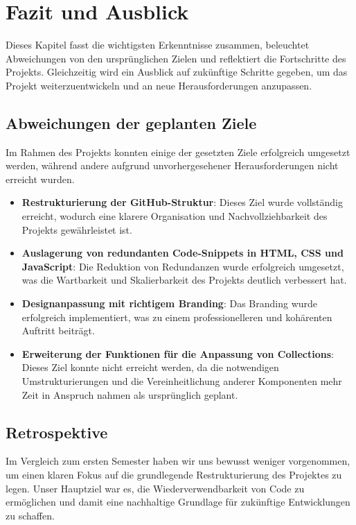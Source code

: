 \section{Fazit und Ausblick}\label{sec:fazit-ausblick}

Dieses Kapitel fasst die wichtigsten Erkenntnisse zusammen, beleuchtet Abweichungen von den ursprünglichen Zielen und reflektiert die Fortschritte des Projekts.
Gleichzeitig wird ein Ausblick auf zukünftige Schritte gegeben, um das Projekt weiterzuentwickeln und an neue Herausforderungen anzupassen.

\subsection{Abweichungen der geplanten Ziele}\label{subsec:abweichungen-der-geplanten-ziele}

Im Rahmen des Projekts konnten einige der gesetzten Ziele erfolgreich umgesetzt werden, während andere aufgrund unvorhergesehener Herausforderungen nicht erreicht wurden.

\begin{itemize}[noitemsep]
    \item \textbf{Restrukturierung der GitHub-Struktur}: Dieses Ziel wurde vollständig erreicht, wodurch eine klarere Organisation und Nachvollziehbarkeit des Projekts gewährleistet ist.
    \item \textbf{Auslagerung von redundanten Code-Snippets in HTML, CSS und JavaScript}: Die Reduktion von Redundanzen wurde erfolgreich umgesetzt, was die Wartbarkeit und Skalierbarkeit des Projekts deutlich verbessert hat.
    \item \textbf{Designanpassung mit richtigem Branding}: Das Branding wurde erfolgreich implementiert, was zu einem professionelleren und kohärenten Auftritt beiträgt.
    \item \textbf{Erweiterung der Funktionen für die Anpassung von Collections}: Dieses Ziel konnte nicht erreicht werden, da die notwendigen Umstrukturierungen und die Vereinheitlichung anderer Komponenten mehr Zeit in Anspruch nahmen als ursprünglich geplant.
\end{itemize}

\subsection{Retrospektive}\label{subsec:retrospektive}

Im Vergleich zum ersten Semester haben wir uns bewusst weniger vorgenommen, um einen klaren Fokus auf die grundlegende Restrukturierung des Projektes zu legen.
Unser Hauptziel war es, die Wiederverwendbarkeit von Code zu ermöglichen und damit eine nachhaltige Grundlage für zukünftige Entwicklungen zu schaffen.

